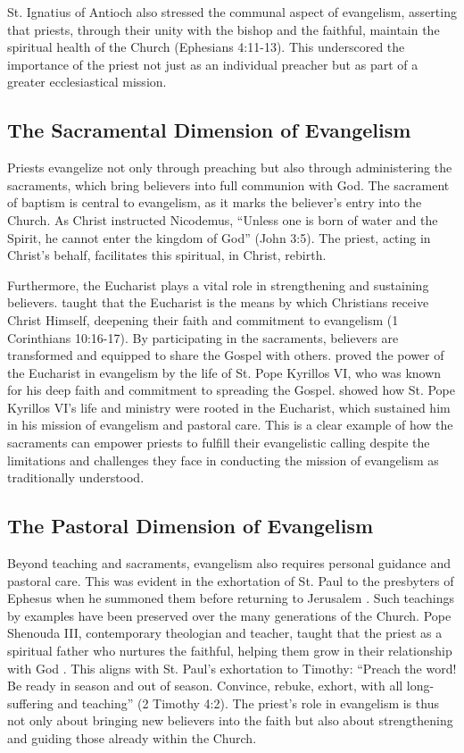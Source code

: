 \documentclass[12pt, doc]{apa7}   	%
\begin{document}
St. Ignatius of Antioch also stressed the communal aspect of evangelism, asserting that priests, through their unity with the bishop and the faithful, maintain the spiritual health of the Church (Ephesians 4:11-13). This underscored the importance of the priest not just as an individual preacher but as part of a greater ecclesiastical mission.

\subsection{The Sacramental Dimension of Evangelism}

Priests evangelize not only through preaching but also through administering the sacraments, which bring believers into full communion with God. The sacrament of baptism is central to evangelism, as it marks the believer’s entry into the Church. As Christ instructed Nicodemus, “Unless one is born of water and the Spirit, he cannot enter the kingdom of God” (John 3:5). The priest, acting in Christ’s behalf, facilitates this spiritual, in Christ, rebirth.

Furthermore, the Eucharist plays a vital role in strengthening and sustaining believers. \citet{st_basil_letters} taught that the Eucharist is the means by which Christians receive Christ Himself, deepening their faith and commitment to evangelism (1 Corinthians 10:16-17). By participating in the sacraments, believers are transformed and equipped to share the Gospel with others.  \citet{fanous_silent_patriarch} proved the power of the Eucharist in evangelism by the life of St. Pope Kyrillos VI, who was known for his deep faith and commitment to spreading the Gospel.  \citeauthor{fanous_silent_patriarch} showed how St. Pope Kyrillos VI’s life and ministry were rooted in the Eucharist, which sustained him in his mission of evangelism and pastoral care.  This is a clear example of how the sacraments can empower priests to fulfill their evangelistic calling despite the limitations and challenges they face in conducting the mission of evangelism as traditionally understood.

\subsection{The Pastoral Dimension of Evangelism}

Beyond teaching and sacraments, evangelism also requires personal guidance and pastoral care.  This was evident in the exhortation of St. Paul to the presbyters of Ephesus when he summoned them before returning to Jerusalem \citep{paul_wright}.  Such teachings by examples have been preserved over the many generations of the Church. Pope Shenouda III, contemporary theologian and teacher, taught that the priest as a spiritual father who nurtures the faithful, helping them grow in their relationship with God \citep{priesthood_shenouda}. This aligns with St. Paul’s exhortation to Timothy: “Preach the word! Be ready in season and out of season. Convince, rebuke, exhort, with all long-suffering and teaching” (2 Timothy 4:2). The priest’s role in evangelism is thus not only about bringing new believers into the faith but also about strengthening and guiding those already within the Church.
\end{document}
